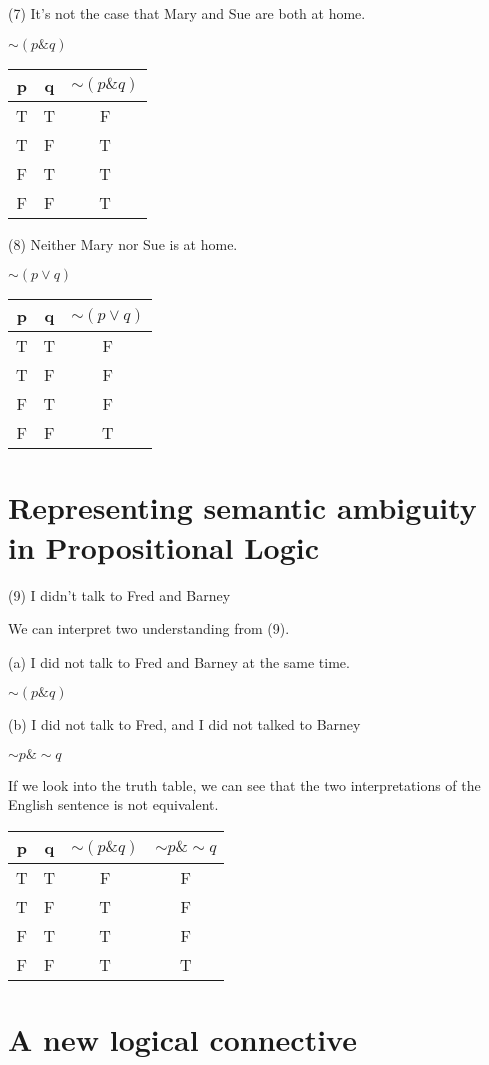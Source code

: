 \documentclass{article}
\begin{document}
(7) It's not the case that Mary and Sue are both at home.

$\sim (p \& q)$

\begin{tabular}{cc|c}
p & q & $\sim (p \& q)$ \\
\hline 
T & T & F  \\
T & F & T \\
F & T & T  \\
F & F & T  \\
\end{tabular}

(8) Neither Mary nor Sue is at home.

$\sim (p \lor q)$

\begin{tabular}{cc|c}
p & q & $\sim (p \lor q)$ \\
\hline 
T & T & F  \\
T & F & F \\
F & T & F  \\
F & F & T  \\
\end{tabular}

\section{Representing semantic ambiguity in Propositional Logic}

(9) I didn't talk to Fred and Barney

We can interpret two understanding from (9).

(a) I did not talk to Fred and Barney at the same time. 

$\sim (p \& q)$

(b) I did not talk to Fred, and I did not talked to Barney

$\sim p \& \sim q$

If we look into the truth table, we can see that the two interpretations of the English sentence is not equivalent. 

\begin{tabular}{cc|cc}
p & q & $\sim (p \& q)$ & $\sim p \& \sim q$\\
\hline 
T & T & F & F  \\
T & F & T & F\\
F & T & T & F\\
F & F & T & T \\
\end{tabular}

\section{A new logical connective}
\end{document}
